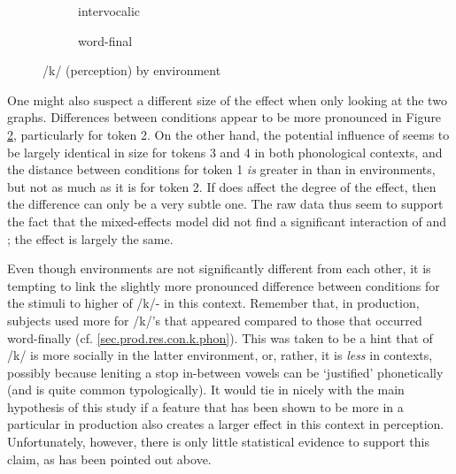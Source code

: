 \begin{figure}[h]
	\centering
	\begin{subfigure}{0.49\textwidth}
		\centering
			\resizebox{\linewidth}{!}{} 
		\caption{intervocalic}
		\label{fig.bar.k.ext.intervoc}
	\end{subfigure}
	\begin{subfigure}{0.49\textwidth}
		\centering
			\resizebox{\linewidth}{!}{}
		\caption{word-final}
		\label{fig.bar.k.ext.wordfinal}
	\end{subfigure}
	\caption{/k/ (perception) by environment}
	\label{fig.bar.k.ext.environment}
\end{figure}

One might also suspect a different size of the  effect when only looking at the two graphs.
Differences between conditions appear to be more pronounced in Figure \ref{fig.bar.k.ext.wordfinal}, particularly for token 2.
On the other hand, the potential influence of  seems to be largely identical in size for tokens 3 and 4 in both phonological contexts, and the distance between conditions for token 1 \emph{is} greater in  than in  environments, but not as much as it is for token 2.
If  does affect the degree of the  effect, then the difference can only be a very subtle one.
The raw data thus seem to support the fact that the mixed-effects model did not find a significant interaction of  and ; the effect is largely the same.

Even though environments are not significantly different from each other, it is tempting to link the slightly more pronounced difference between  conditions for the  stimuli to higher  of /k/- in this context.
Remember that, in production, subjects used more  for /k/'s that appeared  compared to those that occurred word-finally (cf. \ref{sec.prod.res.con.k.phon}).
This was taken to be a hint that  of /k/ is more socially  in the latter environment, or, rather, it is \emph{less}  in  contexts, possibly because leniting a stop in-between vowels can be `justified' phonetically (and is quite common typologically).
It would tie in nicely with the main hypothesis of this study if a feature that has been shown to be more  in a particular  in production also creates a larger  effect in this context in perception.
Unfortunately, however, there is only little statistical evidence to support this claim, as has been pointed out above.

